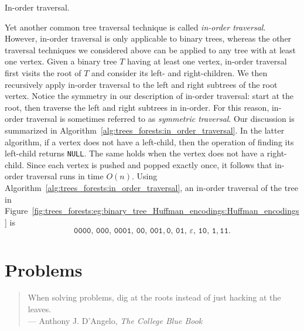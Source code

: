 \begin{algorithm}[!htbp]

\caption{In-order traversal.}
\label{alg:trees_forests:in_order_traversal}
\end{algorithm}

Yet another common tree traversal technique is called
\emph{in-order traversal}. However, in-order
traversal is only applicable to binary trees,
whereas the other traversal techniques we considered above can be
applied to any tree with at least one vertex. Given a binary tree $T$
having at least one vertex, in-order traversal first visits the root
of $T$ and consider its left- and
right-children. We then
recursively apply in-order
traversal to the left and
right subtrees of the root vertex. Notice the
symmetry in our description of in-order
traversal: start at the root, then traverse the left and right
subtrees in in-order. For this reason, in-order traversal is sometimes
referred to as \emph{symmetric traversal}. Our discussion is
summarized in Algorithm~\ref{alg:trees_forests:in_order_traversal}.
In the latter algorithm, if a vertex does not have a left-child, then
the operation of finding its left-child returns \texttt{NULL}. The
same holds when the vertex does not have a right-child. Since each
vertex is pushed and popped exactly
once, it follows that in-order traversal runs in time $O(n)$. Using
Algorithm~\ref{alg:trees_forests:in_order_traversal}, an in-order
traversal of the tree in
Figure~\ref{fig:trees_forests:eg:binary_tree_Huffman_encodings:Huffman_encodings}
is
\[
\texttt{0000},\, \texttt{000},\, \texttt{0001},\, \texttt{00},\,
\texttt{001}, \texttt{0},\, \texttt{01},\, \varepsilon,\,
\texttt{10},\, \texttt{1},\texttt{11}.
\]



\section{Problems}

\begin{quote}
\footnotesize
When solving problems, dig at the roots instead of just hacking at the
leaves. \\
\noindent
--- Anthony J. D'Angelo,
\emph{The College Blue Book}
\end{quote}

